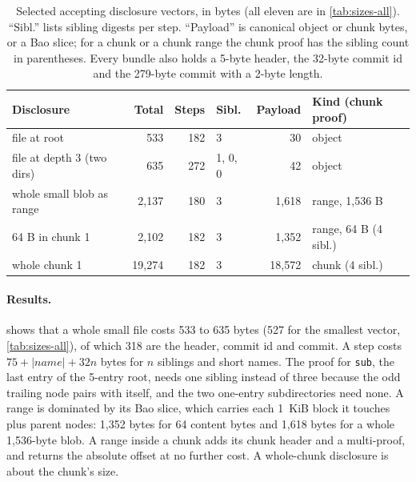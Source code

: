 \documentclass[10pt,letterpaper]{article}
\theoremstyle{remark}
\begin{document}
\begin{table}[!htb]
\centering\footnotesize\setlength{\tabcolsep}{3pt}
\caption{Selected accepting disclosure vectors, in bytes (all eleven are in
\cref{tab:sizes-all}). ``Sibl.'' lists sibling digests per step. ``Payload''
is canonical object or chunk bytes, or a Bao slice; for a chunk or a chunk range the chunk proof has
the sibling count in parentheses. Every bundle also holds a
5-byte header, the 32-byte commit id and the 279-byte commit with a 2-byte
length.}
\label{tab:sizes}
\begin{tabular}{@{}lrrlrl@{}}
\toprule
Disclosure & Total & Steps & Sibl. & Payload & Kind (chunk proof) \\
\midrule
file at root                &    533 & 182 & 3       &     30 & object \\
file at depth 3 (two dirs)  &    635 & 272 & 1, 0, 0 &     42 & object \\
whole small blob as range   &  2,137 & 180 & 3       &  1,618 & range, 1,536 B \\
64 B in chunk 1             &  2,102 & 182 & 3       &  1,352 & range, 64 B (4 sibl.) \\
whole chunk 1               & 19,274 & 182 & 3       & 18,572 & chunk (4 sibl.) \\
\bottomrule
\end{tabular}
\end{table}

\paragraph{Results.}
 shows that a whole small file costs 533 to 635 bytes (527 for
the smallest vector, \cref{tab:sizes-all}), of which 318 are the header,
commit id and commit. A step costs $75 + |\mathit{name}| + 32n$ bytes for $n$
siblings and short names. The proof for \texttt{sub}, the last entry of the
5-entry root, needs one sibling instead of three because the odd trailing node
pairs with itself, and the two one-entry subdirectories need none. A range is
dominated by its Bao slice, which carries each 1~KiB block it touches plus
parent nodes: 1,352 bytes for 64 content bytes and 1,618 bytes for a whole
1,536-byte blob. A range inside a chunk adds its chunk header and a
multi-proof, and returns the absolute offset at no further cost. A whole-chunk disclosure is about the chunk's size.
\end{document}
